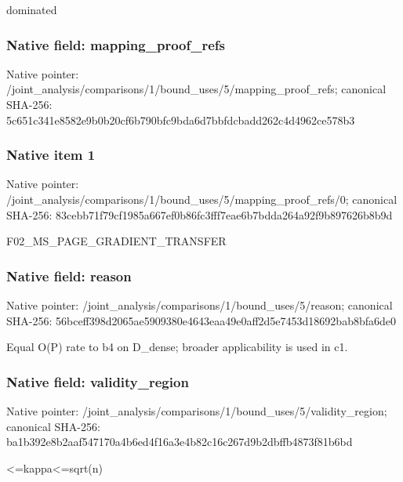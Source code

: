 \documentclass[10pt,a4paper]{article}
\begin{document}
\begingroup\raggedright\sloppy dominated\par\endgroup

\subsubsection{Native field: mapping\_\allowbreak{}proof\_\allowbreak{}refs}
Native pointer: /joint\_\allowbreak{}analysis/comparisons/1/bound\_\allowbreak{}uses/5/mapping\_\allowbreak{}proof\_\allowbreak{}refs; canonical SHA-256: 5c651c341e8582e9b0b20cf6b790bfc9bda6d7bbfdcbadd262c4d4962ce578b3

\subsubsection{Native item 1}
Native pointer: /joint\_\allowbreak{}analysis/comparisons/1/bound\_\allowbreak{}uses/5/mapping\_\allowbreak{}proof\_\allowbreak{}refs/0; canonical SHA-256: 83cebb71f79cf1985a667ef0b86fc3fff7eae6b7bdda264a92f9b897626b8b9d

\begingroup\raggedright\sloppy F02\_\allowbreak{}MS\_\allowbreak{}PAGE\_\allowbreak{}GRADIENT\_\allowbreak{}TRANSFER\par\endgroup

\subsubsection{Native field: reason}
Native pointer: /joint\_\allowbreak{}analysis/comparisons/1/bound\_\allowbreak{}uses/5/reason; canonical SHA-256: 56bceff398d2065ae5909380e4643eaa49e0aff2d5e7453d18692bab8bfa6de0

\begingroup\raggedright\sloppy Equal O(P) rate to b4 on D\_\allowbreak{}dense;\allowbreak{} broader applicability is used in c1.\par\endgroup

\subsubsection{Native field: validity\_\allowbreak{}region}
Native pointer: /joint\_\allowbreak{}analysis/comparisons/1/bound\_\allowbreak{}uses/5/validity\_\allowbreak{}region; canonical SHA-256: ba1b392e8b2aaf547170a4b6ed4f16a3e4b82c16c267d9b2dbffb4873f81b6bd

\begingroup\raggedright{}<=\allowbreak{}kappa<=\allowbreak{}sqrt(n)\par\endgroup
\end{document}
